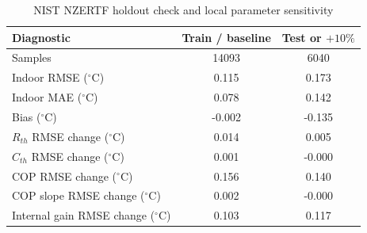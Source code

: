 \begin{table}[!t]
\caption{NIST NZERTF holdout check and local parameter sensitivity}
\label{tab:nist_validation}
\centering
\begin{tabular}{lcc}
\toprule
Diagnostic & Train / baseline & Test or $+10\%$ \\
\midrule
Samples & 14093 & 6040 \\
Indoor RMSE ($^\circ$C) & 0.115 & 0.173 \\
Indoor MAE ($^\circ$C) & 0.078 & 0.142 \\
Bias ($^\circ$C) & -0.002 & -0.135 \\
\midrule
$R_{th}$ RMSE change ($^\circ$C) & 0.014 & 0.005 \\
$C_{th}$ RMSE change ($^\circ$C) & 0.001 & -0.000 \\
COP RMSE change ($^\circ$C) & 0.156 & 0.140 \\
COP slope RMSE change ($^\circ$C) & 0.002 & -0.000 \\
Internal gain RMSE change ($^\circ$C) & 0.103 & 0.117 \\
\bottomrule
\end{tabular}
\end{table}

